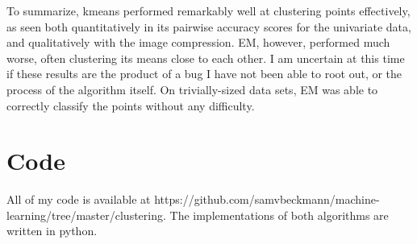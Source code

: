 \documentclass[a4paper]{article}
\begin{document}
To summarize, kmeans performed remarkably well at clustering points effectively, as seen both quantitatively in its pairwise accuracy scores for the univariate data, and qualitatively with the image compression. EM, however, performed much worse, often clustering its means close to each other. I am uncertain at this time if these results are the product of a bug I have not been able to root out, or the process of the algorithm itself. On trivially-sized data sets, EM was able to correctly classify the points without any difficulty.

\appendix

\section{Code}

All of my code is available at https://github.com/samvbeckmann/machine-learning/tree/master/clustering. The implementations of both algorithms are written in python.
\end{document}
